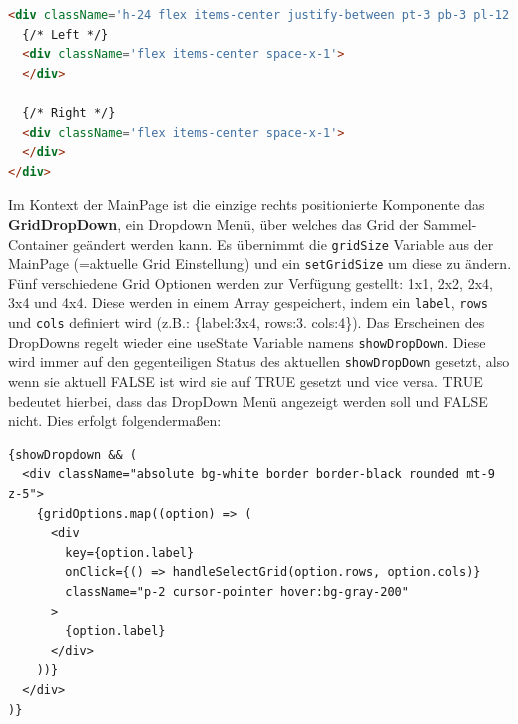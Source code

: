 \documentclass[
    headings=optiontotocandhead,%
    twoside,
    numbers=noenddot,%
    12pt, %
    titlepage, %
    parskip=full, %
    listof=leveldown, 
    numbers=noenddot, %
    a4paper,DIV=14,
    BCOR=15mm,
]{scrbook}
\newcommand{\passthrough}[1]{#1}
\begin{document}
\begin{lstlisting}[language=HTML, caption={Wie die Topbar die Komponente linksbündig und rechtsbündig plartziert werden}]
<div className='h-24 flex items-center justify-between pt-3 pb-3 pl-12 pr-12'>
  {/* Left */}
  <div className='flex items-center space-x-1'>
  </div>

  {/* Right */}
  <div className='flex items-center space-x-1'>
  </div>
</div>
\end{lstlisting}

Im Kontext der MainPage ist die einzige rechts positionierte Komponente
das \textbf{GridDropDown}, ein Dropdown Menü, über welches das Grid der
Sammel-Container geändert werden kann. Es übernimmt die
\passthrough{\lstinline!gridSize!} Variable aus der MainPage (=aktuelle
Grid Einstellung) und ein \passthrough{\lstinline!setGridSize!} um diese
zu ändern. Fünf verschiedene Grid Optionen werden zur Verfügung
gestellt: 1x1, 2x2, 2x4, 3x4 und 4x4. Diese werden in einem Array
gespeichert, indem ein \passthrough{\lstinline!label!},
\passthrough{\lstinline!rows!} und \passthrough{\lstinline!cols!}
definiert wird (z.B.: \{label:3x4, rows:3. cols:4\}). Das Erscheinen des
DropDowns regelt wieder eine useState Variable namens
\passthrough{\lstinline!showDropDown!}. Diese wird immer auf den
gegenteiligen Status des aktuellen
\passthrough{\lstinline!showDropDown!} gesetzt, also wenn sie aktuell
FALSE ist wird sie auf TRUE gesetzt und vice versa. TRUE bedeutet
hierbei, dass das DropDown Menü angezeigt werden soll und FALSE nicht.
Dies erfolgt folgendermaßen:

\begin{lstlisting}[caption={Aufscheinen des Drop Down Menü basierend auf boolean showDropDown}]
{showDropdown && (
  <div className="absolute bg-white border border-black rounded mt-9 z-5">
    {gridOptions.map((option) => (
      <div
        key={option.label}
        onClick={() => handleSelectGrid(option.rows, option.cols)}
        className="p-2 cursor-pointer hover:bg-gray-200"
      >
        {option.label}
      </div>
    ))}
  </div>
)}
\end{lstlisting}
\end{document}
